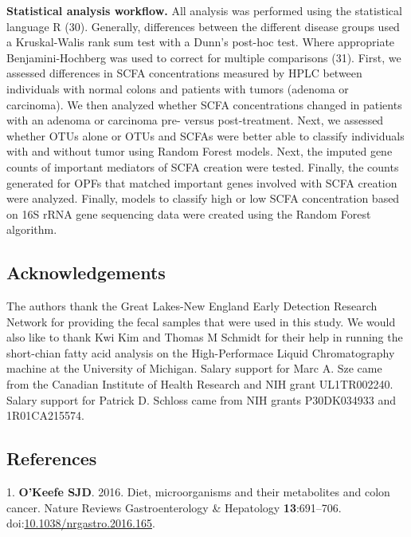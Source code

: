 \documentclass[11pt,]{article}
\begin{document}
\textbf{Statistical analysis workflow.} All analysis was performed using
the statistical language R (30). Generally, differences between the
different disease groups used a Kruskal-Walis rank sum test with a
Dunn's post-hoc test. Where appropriate Benjamini-Hochberg was used to
correct for multiple comparisons (31). First, we assessed differences in
SCFA concentrations measured by HPLC between individuals with normal
colons and patients with tumors (adenoma or carcinoma). We then analyzed
whether SCFA concentrations changed in patients with an adenoma or
carcinoma pre- versus post-treatment. Next, we assessed whether OTUs
alone or OTUs and SCFAs were better able to classify individuals with
and without tumor using Random Forest models. Next, the imputed gene
counts of important mediators of SCFA creation were tested. Finally, the
counts generated for OPFs that matched important genes involved with
SCFA creation were analyzed. Finally, models to classify high or low
SCFA concentration based on 16S rRNA gene sequencing data were created
using the Random Forest algorithm.

\newpage

\subsection{Acknowledgements}\label{acknowledgements}

The authors thank the Great Lakes-New England Early Detection Research
Network for providing the fecal samples that were used in this study. We
would also like to thank Kwi Kim and Thomas M Schmidt for their help in
running the short-chian fatty acid analysis on the High-Performace
Liquid Chromatography machine at the University of Michigan. Salary
support for Marc A. Sze came from the Canadian Institute of Health
Research and NIH grant UL1TR002240. Salary support for Patrick D.
Schloss came from NIH grants P30DK034933 and 1R01CA215574.

\newpage

\subsection{References}\label{references}

\hypertarget{refs}{}
\hypertarget{ref-test_OKeefe2016}{}
1. \textbf{O'Keefe SJD}. 2016. Diet, microorganisms and their
metabolites and colon cancer. Nature Reviews Gastroenterology \&
Hepatology \textbf{13}:691--706.
doi:\href{https://doi.org/10.1038/nrgastro.2016.165}{10.1038/nrgastro.2016.165}.
\end{document}
